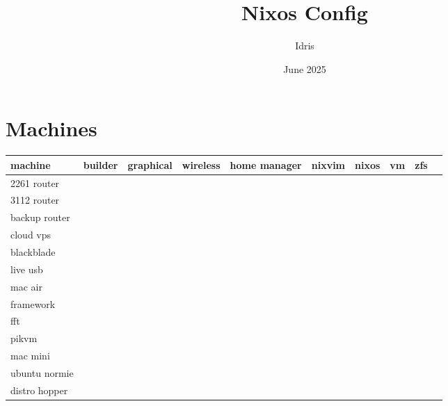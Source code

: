 \documentclass[openany, 12pt]{book}
\title{Nixos Config}
\author{Idris}
\date{June 2025}
\newcommand{\dotmark}{\textbullet{}}
\begin{document}
\tableofcontents

\chapter{Machines}

\begin{center}
	\begin{tabular}{lccccccccc}
		\toprule
		machine       & builder    & graphical  & wireless   & home manager & nixvim     & nixos      & vm         & zfs        \\
		\midrule
		2261 router   &            &            &            &              &            & \dotmark{} &            &            \\
		3112 router   &            &            &            &              &            & \dotmark{} &            &            \\
		backup router &            &            & \dotmark{} &              &            & \dotmark{} &            &            \\
		cloud vps     &            &            &            &              & \dotmark{} & \dotmark{} & \dotmark{} & \dotmark{} \\
		blackblade    &            &            &            &              &            & \dotmark{} &            & \dotmark{} \\
		live usb      &            &            &            &              &            & \dotmark{} &            &            \\
		mac air       &            &            & \dotmark{} &              &            & \dotmark{} &            &            \\
		framework     &            & \dotmark{} & \dotmark{} &              & \dotmark{} & \dotmark{} &            &            \\
		fft           & \dotmark{} &            &            &              &            & \dotmark{} &            &            \\
		pikvm         &            &            &            &              &            & \dotmark{} &            &            \\
		mac mini      & \dotmark{} & \dotmark{} &            & \dotmark{}   &            &            &            &            \\
		ubuntu normie &            &            &            &              &            &            & \dotmark{} &            \\
		distro hopper &            & \dotmark{} &            &              &            &            & \dotmark{} &            \\
		\bottomrule
	\end{tabular}
\end{center}
\end{document}
